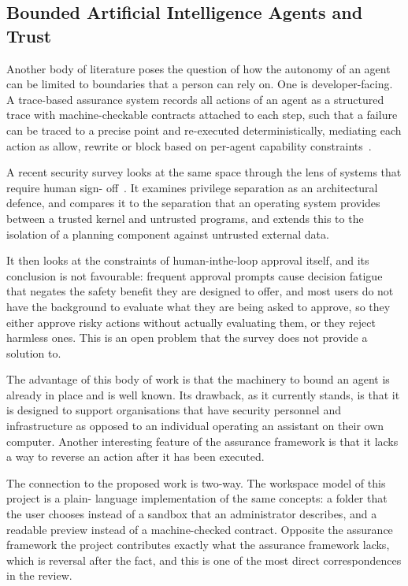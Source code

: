 \documentclass{FastFyp}
\begin{document}
\subsection{Bounded Artificial Intelligence Agents and Trust}
Another body of literature poses the question of how the autonomy of an agent can be limited to boundaries that a person can rely on. One is developer-facing. A trace-based assurance system records all actions of an agent as a structured trace with machine-checkable contracts attached to each step, such that a failure can be traced to a precise point and re-executed deterministically, mediating each action as allow, rewrite or block based on per-agent capability constraints~\cite{ref:paduraru2026}.

A recent security survey looks at the same space through the lens of systems that require human sign- off~\cite{ref:kim2026}. It examines privilege separation as an architectural defence, and compares it to the separation that an operating system provides between a trusted kernel and untrusted programs, and extends this to the isolation of a planning component against untrusted external data.

It then looks at the constraints of human-inthe-loop approval itself, and its conclusion is not favourable: frequent approval prompts cause decision fatigue that negates the safety benefit they are designed to offer, and most users do not have the background to evaluate what they are being asked to approve, so they either approve risky actions without actually evaluating them, or they reject harmless ones. This is an open problem that the survey does not provide a solution to.

The advantage of this body of work is that the machinery to bound an agent is already in place and is well known. Its drawback, as it currently stands, is that it is designed to support organisations that have security personnel and infrastructure as opposed to an individual operating an assistant on their own computer. Another interesting feature of the assurance framework is that it lacks a way to reverse an action after it has been executed.

The connection to the proposed work is two-way. The workspace model of this project is a plain- language implementation of the same concepts: a folder that the user chooses instead of a sandbox that an administrator describes, and a readable preview instead of a machine-checked contract. Opposite the assurance framework the project contributes exactly what the assurance framework lacks, which is reversal after the fact, and this is one of the most direct correspondences in the review.
\end{document}
